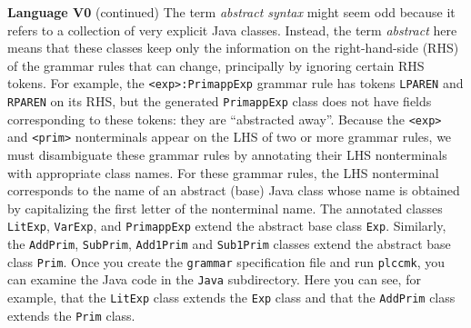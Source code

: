 \begin{minipage}[t]{\sw}
\slidenumber
\LARGE
{\bf Language V0} (continued)\exx
The term {\em abstract syntax} might seem odd
because it refers to a collection of very explicit Java classes.
Instead, the term {\em abstract} here means that
these classes keep only the information on the right-hand-side (RHS)
of the grammar rules that can change,
principally by ignoring certain RHS tokens.
For example, the \verb'<exp>:PrimappExp' grammar rule
has tokens \verb'LPAREN' and \verb'RPAREN' on its RHS,
but the generated \verb'PrimappExp' class
does not have fields corresponding to these tokens:
they are ``abstracted away''.\exx
Because the \verb'<exp>' and \verb'<prim>' nonterminals
appear on the LHS of two or more grammar rules,
we must disambiguate these grammar rules
by annotating their LHS nonterminals with appropriate class names.
For these grammar rules, the LHS nonterminal corresponds to
the name of an abstract (base) Java class
whose name is obtained by capitalizing the first letter
of the nonterminal name.
The annotated classes \verb'LitExp', \verb'VarExp', and \verb'PrimappExp'
extend the abstract base class \verb'Exp'.
Similarly, the \verb'AddPrim', \verb'SubPrim',
\verb'Add1Prim' and \verb'Sub1Prim'
classes extend the abstract base class \verb'Prim'.\exx
Once you create the \verb'grammar' specification file and run \verb'plccmk',
you can examine the Java code in the \verb'Java' subdirectory.
Here you can see, for example,
that the \verb'LitExp' class extends the \verb'Exp' class
and that the \verb'AddPrim' class extends the \verb'Prim' class.
\end{minipage}
\clearpage
